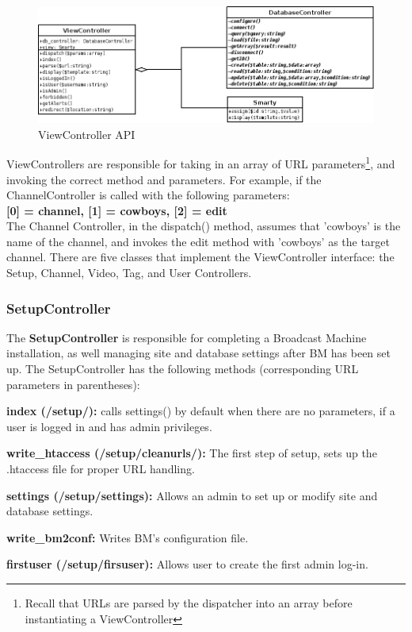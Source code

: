 \documentclass[a4paper,12pt]{report}
\begin{document}
\begin{figure}[h]
\begin{center}
\includegraphics[scale=0.5]{./images/controllers.png}
\end{center}
\caption{ViewController API}
\end{figure}

ViewControllers are responsible for taking in an array of URL parameters\footnote{Recall that URLs are parsed by the dispatcher into an array before instantiating a ViewController}, and invoking the correct method and parameters. For example, if the ChannelController is called with the following parameters: \\

\textbf{[0] = channel, [1] = cowboys, [2] = edit} \\

The Channel Controller, in the dispatch() method, assumes that 'cowboys' is the name of the channel, and invokes the edit method with 'cowboys' as the target channel. There are five classes that implement the ViewController interface: the Setup, Channel, Video, Tag, and User Controllers. \\

\subsubsection{SetupController}
The \textbf{SetupController} is responsible for completing a Broadcast Machine installation, as well managing site  and database settings after BM has been set up. The SetupController has the following methods (corresponding URL parameters in parentheses):
\begin{description}
\item{\textbf{index (/setup/): }calls settings() by default when there are no parameters, if a user is logged in and has admin privileges.}
\item{\textbf{write\_htaccess (/setup/cleanurls/): }The first step of setup, sets up the .htaccess file for proper URL handling.}
\item{\textbf{settings (/setup/settings): } Allows an admin to set up or modify site and database settings.}
\item{\textbf{write\_bm2conf: } Writes BM's configuration file.}
\item{\textbf{firstuser (/setup/firsuser): } Allows user to create the first admin log-in.} \\
\end{description} 
\end{document}
